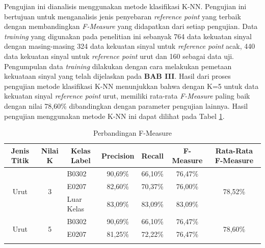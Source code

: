 \begin{enumerate}
	      \par Pengujian ini dianalisis menggunakan metode klasifikasi K-NN. Pengujian ini bertujuan untuk menganalisis jenis penyebaran \textit{reference point} yang terbaik dengan membandingkan \textit{F-Measure} yang didapatkan dari setiap pengujian. Data \textit{training} yang digunakan pada penelitian ini sebanyak 764 data kekuatan sinyal dengan masing-masing 324 data kekuatan sinyal untuk \textit{reference point} acak, 440 data kekuatan sinyal untuk \textit{reference point} urut dan 160 sebagai data uji. Pengumpulan data \textit{training} dilakukan dengan cara melakukan pemetaan kekuataan sinyal yang telah dijelaskan pada \textbf{BAB III}. Hasil dari proses pengujian metode klasifikasi K-NN menunjukkan bahwa dengan K=5 untuk data kekuatan sinyal \textit{reference point} urut, memiliki rata-rata \textit{F-Measure} paling baik dengan nilai 78,60\% dibandingkan dengan parameter pengujian lainnya. Hasil pengujian menggunakan metode K-NN ini  dapat dilihat pada Tabel \ref{tabelfmeasure9}.
	      \begin{table}[H]
		      \fontsize{9}{12}\selectfont
		      \center
		      \caption{Perbandingan F-Measure}
		      \label{tabelfmeasure9}
		      \begin{tabular}{|c|c|l|c|c|c|c|}
			      \hline
			      Jenis Titik           & Nilai K            & \multicolumn{1}{c|}{Kelas Label} & Precision & Recall  & F-Measure & Rata-Rata F-Measure      \\ \hline
			      \multirow{3}{*}{Urut} & \multirow{3}{*}{3} & B0302                            & 90,69\%   & 66,10\% & 76,47\%   & \multirow{3}{*}{78,52\%} \\ \cline{3-6}
			                            &                    & E0207                            & 82,60\%   & 70,37\% & 76,00\%   &                          \\ \cline{3-6}
			                            &                    & Luar Kelas                       & 83,09\%   & 83,09\% & 83,09\%   &                          \\ \hline
			      \multirow{3}{*}{Urut} & \multirow{3}{*}{5} & B0302                            & 90,69\%   & 66,10\% & 76,47\%   & \multirow{3}{*}{78,60\%} \\ \cline{3-6}
			                            &                    & E0207                            & 81,25\%   & 72,22\% & 76,47\%   &                          \\ \cline{3-6}

\end{tabular}
\end{table}
\end{enumerate}
